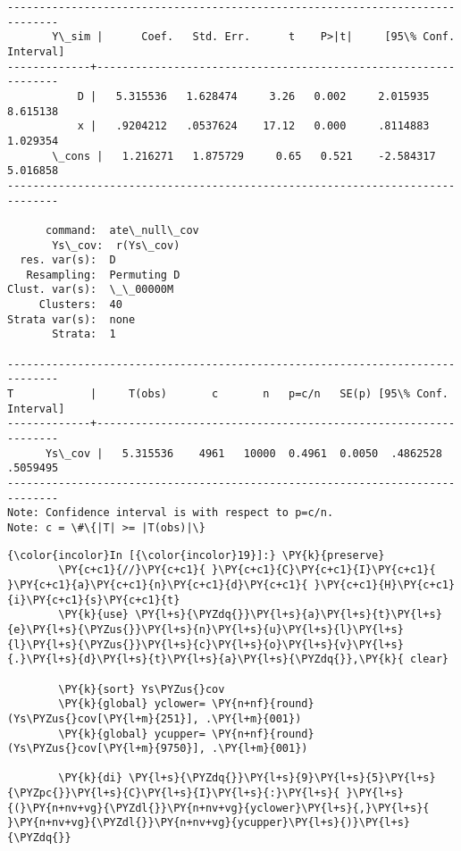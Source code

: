 \documentclass[11pt,notitlepage]{article}\usepackage[]{graphicx}\usepackage[]{color}
\makeatletter
\newenvironment{kframe}{%
 \def\at@end@of@kframe{}%
 \ifinner\ifhmode%
  \def\at@end@of@kframe{\end{minipage}}%
  \begin{minipage}{\columnwidth}%
 \fi\fi%
 \def\FrameCommand##1{\hskip\@totalleftmargin \hskip-\fboxsep
 \colorbox{shadecolor}{##1}\hskip-\fboxsep
     \hskip-\linewidth \hskip-\@totalleftmargin \hskip\columnwidth}%
 \MakeFramed {\advance\hsize-\width
   \@totalleftmargin\z@ \linewidth\hsize
   \@setminipage}}%
 {\par\unskip\endMakeFramed%
 \at@end@of@kframe}
\newenvironment{knitrout}{}{} %
\makeatother
\begin{document}
\begin{enumerate}[a)]
\begin{knitrout}
\begin{kframe}
\begin{Verbatim}[commandchars=\\\{\}]
------------------------------------------------------------------------------
       Y\_sim |      Coef.   Std. Err.      t    P>|t|     [95\% Conf. Interval]
-------------+----------------------------------------------------------------
           D |   5.315536   1.628474     3.26   0.002     2.015935    8.615138
           x |   .9204212   .0537624    17.12   0.000     .8114883    1.029354
       \_cons |   1.216271   1.875729     0.65   0.521    -2.584317    5.016858
------------------------------------------------------------------------------

      command:  ate\_null\_cov
       Ys\_cov:  r(Ys\_cov)
  res. var(s):  D
   Resampling:  Permuting D
Clust. var(s):  \_\_00000M
     Clusters:  40
Strata var(s):  none
       Strata:  1

------------------------------------------------------------------------------
T            |     T(obs)       c       n   p=c/n   SE(p) [95\% Conf. Interval]
-------------+----------------------------------------------------------------
      Ys\_cov |   5.315536    4961   10000  0.4961  0.0050  .4862528   .5059495
------------------------------------------------------------------------------
Note: Confidence interval is with respect to p=c/n.
Note: c = \#\{|T| >= |T(obs)|\}

    \end{Verbatim}

    \begin{Verbatim}[commandchars=\\\{\}]
{\color{incolor}In [{\color{incolor}19}]:} \PY{k}{preserve}
        \PY{c+c1}{//}\PY{c+c1}{ }\PY{c+c1}{C}\PY{c+c1}{I}\PY{c+c1}{ }\PY{c+c1}{a}\PY{c+c1}{n}\PY{c+c1}{d}\PY{c+c1}{ }\PY{c+c1}{H}\PY{c+c1}{i}\PY{c+c1}{s}\PY{c+c1}{t}
        \PY{k}{use} \PY{l+s}{\PYZdq{}}\PY{l+s}{a}\PY{l+s}{t}\PY{l+s}{e}\PY{l+s}{\PYZus{}}\PY{l+s}{n}\PY{l+s}{u}\PY{l+s}{l}\PY{l+s}{l}\PY{l+s}{\PYZus{}}\PY{l+s}{c}\PY{l+s}{o}\PY{l+s}{v}\PY{l+s}{.}\PY{l+s}{d}\PY{l+s}{t}\PY{l+s}{a}\PY{l+s}{\PYZdq{}},\PY{k}{ clear}
        
        \PY{k}{sort} Ys\PYZus{}cov
        \PY{k}{global} yclower= \PY{n+nf}{round}(Ys\PYZus{}cov[\PY{l+m}{251}], .\PY{l+m}{001})
        \PY{k}{global} ycupper= \PY{n+nf}{round}(Ys\PYZus{}cov[\PY{l+m}{9750}], .\PY{l+m}{001})
        
        \PY{k}{di} \PY{l+s}{\PYZdq{}}\PY{l+s}{9}\PY{l+s}{5}\PY{l+s}{\PYZpc{}}\PY{l+s}{C}\PY{l+s}{I}\PY{l+s}{:}\PY{l+s}{ }\PY{l+s}{(}\PY{n+nv+vg}{\PYZdl{}}\PY{n+nv+vg}{yclower}\PY{l+s}{,}\PY{l+s}{ }\PY{n+nv+vg}{\PYZdl{}}\PY{n+nv+vg}{ycupper}\PY{l+s}{)}\PY{l+s}{\PYZdq{}} 
        

\end{Verbatim}
\end{kframe}
\end{knitrout}
\end{enumerate}
\end{document}
